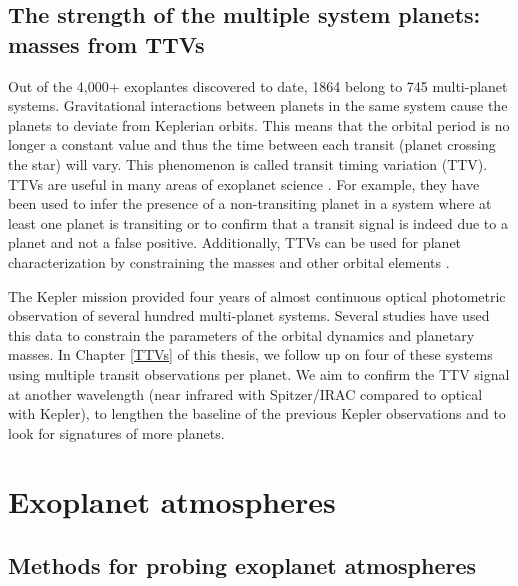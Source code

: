 
\subsection{The strength of the multiple system planets: masses from TTVs}%

Out of the 4,000+ exoplantes discovered to date, 1864 belong to 745 multi-planet systems. Gravitational interactions between planets in the same system cause the planets to deviate from Keplerian orbits. This means that the orbital period is no longer a constant value and thus the time between each transit (planet crossing the star) will vary. This phenomenon is called transit timing variation (TTV). TTVs are useful in many areas of exoplanet science \citep[e.g.,][]{Schneider2003, Agol2005, Holman2005}. For example, they have been used to infer the presence of a non-transiting planet in a system where at least one planet is transiting or to confirm that a transit signal is indeed due to a planet and not a false positive. Additionally, TTVs can be used for planet characterization by constraining the masses and other orbital elements \citep[e.g.,][]{Ballard2011, Holman2010, Carter2012}.

 The Kepler mission provided four years of almost continuous optical photometric observation of several hundred multi-planet systems. Several studies have used this data to constrain the parameters of the orbital dynamics and planetary masses. In Chapter \ref{TTVs} of this thesis, we follow up on four of these systems using multiple transit observations per planet. We aim to confirm the TTV signal at another wavelength (near infrared with Spitzer/IRAC compared to optical with Kepler), to lengthen the baseline of the previous Kepler observations and to look for signatures of more planets.

\section{Exoplanet atmospheres}
\subsection{Methods for probing exoplanet atmospheres}%

